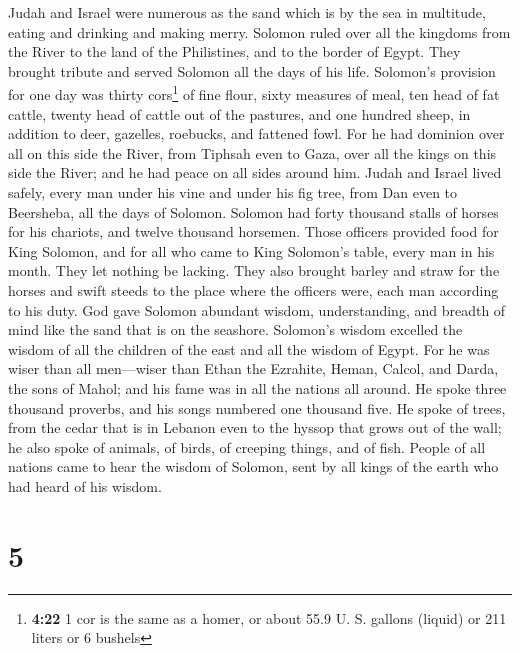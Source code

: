  Judah and Israel were numerous as the sand which is by
the sea in multitude, eating and drinking and making merry.
 Solomon ruled over all the kingdoms from the River to
the land of the Philistines, and to the border of Egypt. They brought
tribute and served Solomon all the days of his life. 
Solomon's provision for one day was thirty cors\footnote{\textbf{4:22} 1
  cor is the same as a homer, or about 55.9 U. S. gallons (liquid) or
  211 liters or 6 bushels} of fine flour, sixty measures of meal,
 ten head of fat cattle, twenty head of cattle out of the
pastures, and one hundred sheep, in addition to deer, gazelles,
roebucks, and fattened fowl.  For he had dominion over
all on this side the River, from Tiphsah even to Gaza, over all the
kings on this side the River; and he had peace on all sides around him.
 Judah and Israel lived safely, every man under his vine
and under his fig tree, from Dan even to Beersheba, all the days of
Solomon.  Solomon had forty thousand stalls of horses for
his chariots, and twelve thousand horsemen.  Those
officers provided food for King Solomon, and for all who came to King
Solomon's table, every man in his month. They let nothing be lacking.
 They also brought barley and straw for the horses and
swift steeds to the place where the officers were, each man according to
his duty.  God gave Solomon abundant wisdom,
understanding, and breadth of mind like the sand that is on the
seashore.  Solomon's wisdom excelled the wisdom of all
the children of the east and all the wisdom of Egypt. 
For he was wiser than all men---wiser than Ethan the Ezrahite, Heman,
Calcol, and Darda, the sons of Mahol; and his fame was in all the
nations all around.  He spoke three thousand proverbs,
and his songs numbered one thousand five.  He spoke of
trees, from the cedar that is in Lebanon even to the hyssop that grows
out of the wall; he also spoke of animals, of birds, of creeping things,
and of fish.  People of all nations came to hear the
wisdom of Solomon, sent by all kings of the earth who had heard of his
wisdom.

\hypertarget{section-4}{%
\section{5}\label{section-4}}

